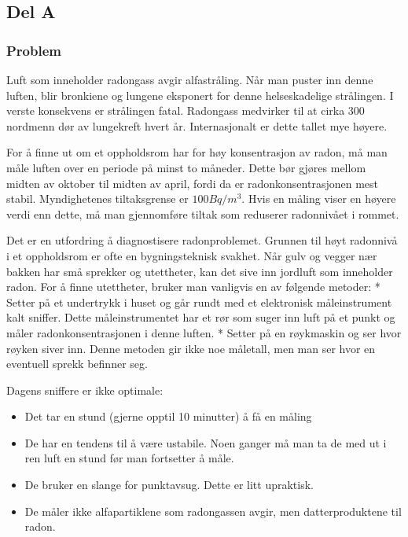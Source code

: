 \subsection{Del A}

\subsubsection{Problem}

Luft som inneholder radongass avgir alfastråling. Når man puster inn denne luften, blir bronkiene og lungene eksponert for denne helseskadelige strålingen. I verste konsekvens er strålingen fatal. Radongass medvirker til at cirka 300 nordmenn dør av lungekreft hvert år. Internasjonalt er dette tallet mye høyere.

For å finne ut om et oppholdsrom har for høy konsentrasjon av radon, må man måle luften over en periode på minst to måneder. Dette bør gjøres mellom midten av oktober til midten av april, fordi da er radonkonsentrasjonen mest stabil. Myndighetenes tiltaksgrense er $100 Bq/m^3$. Hvis en måling viser en høyere verdi enn dette, må man gjennomføre tiltak som reduserer radonnivået i rommet.

Det er en utfordring å diagnostisere radonproblemet. Grunnen til høyt radonnivå i et oppholdsrom er ofte en bygningsteknisk svakhet. Når gulv og vegger nær bakken har små sprekker og utettheter, kan det sive inn jordluft som inneholder radon. For å finne utettheter, bruker man vanligvis en av følgende metoder:
* Setter på et undertrykk i huset og går rundt med et elektronisk måleinstrument kalt sniffer. Dette måleinstrumentet har et rør som suger inn luft på et punkt og måler radonkonsentrasjonen i denne luften.
* Setter på en røykmaskin og ser hvor røyken siver inn. Denne metoden gir ikke noe måletall, men man ser hvor en eventuell sprekk befinner seg.

Dagens sniffere er ikke optimale:
\begin{itemize}
	\item Det tar en stund (gjerne opptil 10 minutter) å få en måling
	\item De har en tendens til å være ustabile. Noen ganger må man ta de med ut i ren luft en stund før man fortsetter å måle.
	\item De bruker en slange for punktavsug. Dette er litt upraktisk.
	\item De måler ikke alfapartiklene som radongassen avgir, men datterproduktene til radon.
\end{itemize}

